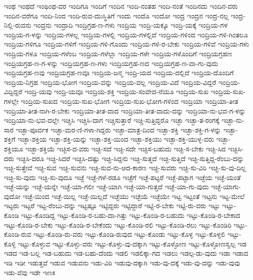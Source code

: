 {ಇಂಥ
ಇಂಥದೆ
ಇಂಥಿಂಥ-ವರ
ಇಂದಿಗೂ
ಇಂದಿಗೆ
ಇಂದಿನ
ಇಂದಿ-ನಂತಹ
ಇಂದಿ-ನಂತೆ
ಇಂದಿನದು
ಇಂದಿನ-ವರು
ಇಂದಿನ-ವರೆಗೂ
ಇಂದಿ-ನಿಂದ
ಇಂದಿ-ರುವ-ದುಃಸ್ಥಿತಿಗೆ
ಇಂದು
ಇಂದೊ
ಇಂದೋ
ಇಂದ್ರ
ಇಂದ್ರನ
ಇಂದ್ರ-ನಲ್ಲ
ಇಂದ್ರ-ನಿಲ್ಲಿ-ರುವನು
ಇಂದ್ರನು
ಇಂದ್ರಾದಿ
ಇಂದ್ರಿಗ್ರಹ-ಣ-ಗಳು
ಇಂದ್ರಿಯ
ಇಂದ್ರಿ-ಯಕ್ಕೂ
ಇಂದ್ರಿ-ಯಕ್ಕೆ
ಇಂದ್ರಿಯ-ಗಳ
ಇಂದ್ರಿಯ-ಗ-ಳನ್ನು
ಇಂದ್ರಿಯ-ಗಳಲ್ಲ
ಇಂದ್ರಿಯ-ಗಳಲ್ಲಿ
ಇಂದ್ರಿಯ-ಗಳಲ್ಲಿದೆ
ಇಂದ್ರಿಯ-ಗಳಿಂದ
ಇಂದ್ರಿಯ-ಗಳಿ-ಗಿಂತಲೂ
ಇಂದ್ರಿಯ-ಗಳಿಗೂ
ಇಂದ್ರಿಯ-ಗಳಿಗೆ
ಇಂದ್ರಿಯ-ಗಳಿ-ಗೊಂದು
ಇಂದ್ರಿಯ-ಗಳಿ-ರ-ಬೇಕು
ಇಂದ್ರಿಯ-ಗಳಿವೆ
ಇಂದ್ರಿಯ-ಗಳು
ಇಂದ್ರಿಯ-ಗಳೂ
ಇಂದ್ರಿಯ-ಗಳೆಂಬ
ಇಂದ್ರಿಯ-ಗಳೆಲ್ಲಾ
ಇಂದ್ರಿಯ-ಗಳೇ
ಇಂದ್ರಿಯ-ಗಳೊಂದಿಗೆ
ಇಂದ್ರಿಯಗ್ರಹಣ
ಇಂದ್ರಿಯಗ್ರಹ-ಣ-ಗ-ಳನ್ನು
ಇಂದ್ರಿಯಗ್ರಹ-ಣ-ಗಳು
ಇಂದ್ರಿಯಗ್ರಹ-ಣದ
ಇಂದ್ರಿಯಗ್ರಹ-ಣ-ವಾ-ಗು-ವುದು
ಇಂದ್ರಿಯಗ್ರಹ-ಣವು
ಇಂದ್ರಿಯಗ್ರಹ-ಣವೂ
ಇಂದ್ರಿಯ-ಜನ್ಮ
ಇಂದ್ರಿ-ಯದ
ಇಂದ್ರಿಯ-ದಲ್ಲಿದೆ
ಇಂದ್ರಿಯ-ದೊಂದಿಗೆ
ಇಂದ್ರಿಯ-ನಿಗ್ರಹ
ಇಂದ್ರಿಯ-ಭೋಗ
ಇಂದ್ರಿಯ-ವನ್ನು
ಇಂದ್ರಿಯ-ವಲ್ಲ
ಇಂದ್ರಿಯ-ವಿದೆ
ಇಂದ್ರಿಯ-ವಿದ್ದರೆ
ಇಂದ್ರಿಯ-ವಿದ್ದಿದ್ದರೆ
ಇಂದ್ರಿ-ಯವು
ಇಂದ್ರಿ-ಯವೂ
ಇಂದ್ರಿಯ-ಶಕ್ತಿ
ಇಂದ್ರಿಯ-ಸಂವೇದ-ನೆಯೂ
ಇಂದ್ರಿಯ-ಸುಖ
ಇಂದ್ರಿಯ-ಸುಖ-ಗಳಲ್ಲೇ
ಇಂದ್ರಿಯ-ಸುಖದ
ಇಂದ್ರಿಯ-ಸುಖ-ಭೋಗ
ಇಂದ್ರಿಯ-ಸುಖ-ಭೋಗ-ಗಳಿಂದ
ಇಂದ್ರಿಯಾ
ಇಂದ್ರಿಯಾ-ತೀತ
ಇಂದ್ರಿಯಾ-ತೀತ-ನಾಗಿ-ರ-ಬೇಕು
ಇಂದ್ರಿಯಾ-ತೀತ-ವಾದ
ಇಂದ್ರಿಯಾ-ತೀತ-ವಾದು-ದನ್ನು
ಇಂದ್ರಿಯಾ-ನು-ಭವ-ಗ-ಳನ್ನು
ಇಂದ್ರಿಯಾ-ನು-ಭವ-ದಲ್ಲೇ
ಇಚ್ಚಿಸಿ
ಇಚ್ಚಿಸಿ-ದಾಗ
ಇಚ್ಚಿಸುತ್ತಾರೆ
ಇಚ್ಚಿ-ಸುತ್ತಿದ್ದರೊ
ಇಚ್ಛಾ
ಇಚ್ಛಾ-ತ-ರಂಗಕ್ಕೆ
ಇಚ್ಛಾ-ನು-ಸಾರ
ಇಚ್ಛಾ-ಪೂರ್ವಕ
ಇಚ್ಛಾ-ಮರ-ಣಿ-ಗಳಾ-ಗಿದ್ದರು
ಇಚ್ಛಾ-ಮಾತ್ರ-ದಿಂದ
ಇಚ್ಛಾ-ಶಕ್ತಿ
ಇಚ್ಛಾ-ಶಕ್ತಿ-ಗ-ಳನ್ನು
ಇಚ್ಛಾ-ಶಕ್ತಿಗೆ
ಇಚ್ಛಾ-ಶಕ್ತಿಯ
ಇಚ್ಛಾ-ಶಕ್ತಿ-ಯನ್ನು
ಇಚ್ಛಾ-ಶಕ್ತಿ-ಯಿಂದ
ಇಚ್ಛಾ-ಶಕ್ತಿಯು
ಇಚ್ಛಾ-ಶಕ್ತಿ-ಯುಳ್ಳ-ವರು
ಇಚ್ಛಾ-ಶಕ್ತಿಯೂ
ಇಚ್ಛಾ-ಶಕ್ತಿಯೆ
ಇಚ್ಛಿಸ-ದ-ವರು
ಇಚ್ಛಿ-ಸದೆ
ಇಚ್ಛಿ-ಸದೇ
ಇಚ್ಛಿಸ-ಬಹುದು
ಇಚ್ಛಿ-ಸ-ಬೇಕು
ಇಚ್ಛಿ-ಸಿದ
ಇಚ್ಛಿಸಿ-ದರು
ಇಚ್ಛಿಸಿ-ದರೂ
ಇಚ್ಛಿ-ಸಿದರೆ
ಇಚ್ಛಿಸಿ-ದಷ್ಟು
ಇಚ್ಛಿ-ಸಿದ್ದನು
ಇಚ್ಛಿ-ಸುತ್ತದೆ
ಇಚ್ಛಿ-ಸುತ್ತಿದೆ
ಇಚ್ಛಿ-ಸುತ್ತಿದ್ದ-ರೆಂಬು-ದನ್ನು
ಇಚ್ಛಿ-ಸುತ್ತೇವೆ
ಇಚ್ಛಿ-ಸುವ
ಇಚ್ಛಿ-ಸುವನು
ಇಚ್ಛಿ-ಸುವ-ನು-ಆದ-ಕಾರಣ
ಇಚ್ಛಿ-ಸುವರು
ಇಚ್ಛಿ-ಸು-ವಿರಿ
ಇಚ್ಛಿ-ಸು-ವು-ದಿಲ್ಲ
ಇಚ್ಛಿ-ಸು-ವುದು
ಇಚ್ಛಿ-ಸು-ವುದೂ
ಇಚ್ಛೆ
ಇಚ್ಛೆ-ಗಳೆ-ರಡೂ
ಇಚ್ಛೆಗೆ
ಇಚ್ಛೆ-ಪಟ್ಟರೆ
ಇಚ್ಛೆ-ಪಟ್ಟಾಗ
ಇಚ್ಛೆಯ
ಇಚ್ಛೆ-ಯಂತೆ
ಇಚ್ಛೆ-ಯನ್ನು
ಇಚ್ಛೆ-ಯನ್ನೇ
ಇಚ್ಛೆ-ಯಾ-ಗಲೀ
ಇಚ್ಛೆ-ಯಾಗಿ
ಇಚ್ಛೆ-ಯಾ-ಗುತ್ತದೆ
ಇಚ್ಛೆ-ಯಾ-ಗು-ವುದು
ಇಚ್ಛೆ-ಯಾಗು-ವುದೋ
ಇಚ್ಛೆ-ಯಿಂದ
ಇಚ್ಛೆ-ಯಿಲ್ಲ
ಇಚ್ಛೆ-ಯಿಲ್ಲದೆ
ಇಚ್ಛೆಯು
ಇಚ್ಛೆಯೆ
ಇಚ್ಛೆಯೇ
ಇಟ್ಟ
ಇಟ್ಟಂತೆ
ಇಟ್ಟನು
ಇಟ್ಟ-ಮೇಲೆ
ಇಟ್ಟರು
ಇಟ್ಟರೆ
ಇಟ್ಟ-ರೆಂಬು-ದನ್ನು
ಇಟ್ಟಷ್ಟೂ
ಇಟ್ಟಿದ್ದರು
ಇಟ್ಟಿದ್ದಾರೆ
ಇಟ್ಟಿ-ರ-ಬೇಕು
ಇಟ್ಟಿ-ರು-ವರು
ಇಟ್ಟು
ಇಟ್ಟು-ಕೊಂಡಿ
ಇಟ್ಟು-ಕೊಂಡಿದ್ದ
ಇಟ್ಟು-ಕೊಂಡಿ-ರ-ಬಹು-ದಾ-ಗಿತ್ತು
ಇಟ್ಟು-ಕೊಂಡಿ-ರ-ಬಹುದು
ಇಟ್ಟು-ಕೊಂಡಿ-ರ-ಬೇಕಾದ
ಇಟ್ಟು-ಕೊಂಡಿ-ರ-ಬೇಕು
ಇಟ್ಟು-ಕೊಂಡಿ-ರ-ಬೇಕೆಂದು
ಇಟ್ಟು-ಕೊಂಡಿ-ರಲಿ
ಇಟ್ಟು-ಕೊಂಡಿ-ರಲು
ಇಟ್ಟು-ಕೊಂಡಿರಿ
ಇಟ್ಟು-ಕೊಂಡಿ-ರುವ
ಇಟ್ಟು-ಕೊಂಡಿ-ರು-ವರು
ಇಟ್ಟು-ಕೊಂಡಿ-ರುವುದ
ಇಟ್ಟು-ಕೊಂಡು
ಇಟ್ಟು-ಕೊಳ್ಳ
ಇಟ್ಟು-ಕೊಳ್ಳಲಿ
ಇಟ್ಟು-ಕೊಳ್ಳಿ
ಇಟ್ಟು-ಕೊಳ್ಳುವ
ಇಟ್ಟು-ಕೊಳ್ಳು-ವರು
ಇಟ್ಟು-ಕೊಳ್ಳು-ವು-ದಕ್ಕಾಗಿ
ಇಟ್ಟು-ಕೊಳ್ಳೋಣ
ಇಟ್ಟು-ಕೊಳ್ಳೋಣಸ್ವಲ್ಪ
ಇಡ
ಇಡದ
ಇಡ-ಬಲ್ಲ
ಇಡ-ಬಹುದು
ಇಡ-ಬಹು-ದೆಂದು
ಇಡಲಿ
ಇಡಲಿಕ್ಕಾ-ಗದ
ಇಡಲು
ಇಡಲ್ಪ-ಡು-ವುದು
ಇಡಾ
ಇಡಾದ
ಇಡಿ
ಇಡೀ
ಇಡುತ್ತವೆ
ಇಡುವ
ಇಡುವನು
ಇಡು-ವಿರಿ
ಇಡುವು-ದಕ್ಕಾಗಿ
ಇಡು-ವು-ದಕ್ಕೆ
ಇಡು-ವು-ದನ್ನು
ಇಡು-ವುವು
ಇಡು-ವೆವು
ಇಡೇ
ಇಣಕಿ
}
